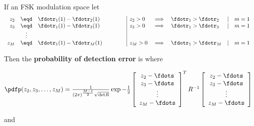 \begin{theorem}
If an FSK modulation space let 
\[
\begin{array}{rcl l| lllll}
   z_2 &\eqd& \fdotr_{1}(1) - \fdotr_{2}(1) &\hspace{1cm}& z_2>0 &\implies& \fdotr_1>\fdotr_2 &|& m=1 \\
   z_3 &\eqd& \fdotr_{1}(1) - \fdotr_{3}(1) &\hspace{1cm}& z_3>0 &\implies& \fdotr_1>\fdotr_3 &|& m=1 \\
       &\vdots&                               &            & \\    
   z_M &\eqd& \fdotr_{1}(1) - \fdotr_{M}(1) &\hspace{1cm}& z_M>0 &\implies& \fdotr_1>\fdotr_M &|& m=1 \\
\end{array}
\]

Then the {\bf probability of detection error} is
where

\begin{math}
\pdfp(z_2,z_3,\ldots,z_M)
   = 
   \frac{1}{(2\pi)^\frac{M-1}{2}\sqrt{\mathrm{det}{R}}}
   \exp{
      -\frac{1}{2}
      \left[  
      \begin{array}{c}
         z_2 - \fdots \\
         z_3 - \fdots \\
         \vdots \\
         z_M - \fdots
      \end{array}
      \right]^T
      R^{-1}
      \left[  
      \begin{array}{c}
         z_2 - \fdots \\
         z_3 - \fdots \\
         \vdots \\
         z_M - \fdots
      \end{array}
      \right]
   }
\end{math}

and


\end{theorem}
